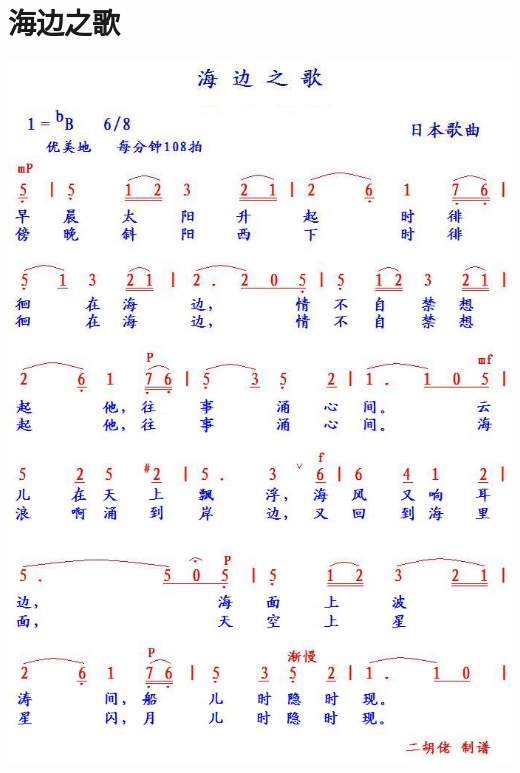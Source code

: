 \documentclass[cn,pad,chinese,chinesefont=nofont]{elegantbook}
\begin{document}
\section{海边之歌}
    \includegraphics[height=\textheight]{dongxiao/日本-海边之歌.jpg}
\end{document}
